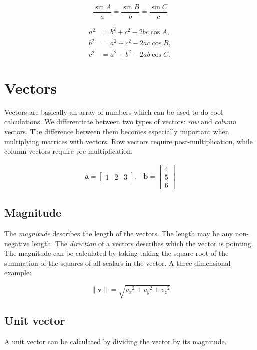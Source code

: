 \documentclass[a4paper,11pt]{article}
\begin{document}
$$\frac{\sin A}{a}=\frac{\sin B}{b}=\frac{\sin C}{c}$$

\begin{align*}
a^2 &= b^2 + c^2 - 2bc\cos A, \\
b^2 &= a^2 + c^2 - 2ac\cos B, \\
c^2 &= a^2 + b^2 - 2ab\cos C.
\end{align*}

\newpage
\section{Vectors}

Vectors are basically an array of numbers which can be used to do cool calculations. We differentiate between two types of vectors: \textit{row} and \textit{column} vectors. The difference between them becomes especially important when multiplying matrices with vectors. Row vectors require post-multiplication, while column vectors require pre-multiplication.

$$
\begin{array}{cc}
\textbf{a} = \begin{bmatrix}
1 & 2 & 3
\end{bmatrix},
&
\textbf{b} = \begin{bmatrix}
4 \\ 5 \\ 6
\end{bmatrix}
\end{array}
$$

\subsection{Magnitude}

The \textit{magnitude} describes the length of the vectors. The length may be any non-negative length. The \textit{direction} of a vectors describes which the vector is pointing. The magnitude can be calculated by taking taking the square root of the summation of the squares of all scalars in the vector. A three dimensional example:

$$\|\textbf{v}\|=\sqrt{{v_x}^2+{v_y}^2+{v_z}^2}$$

\subsection{Unit vector}

A unit vector can be calculated by dividing the vector by its magnitude.
\end{document}

